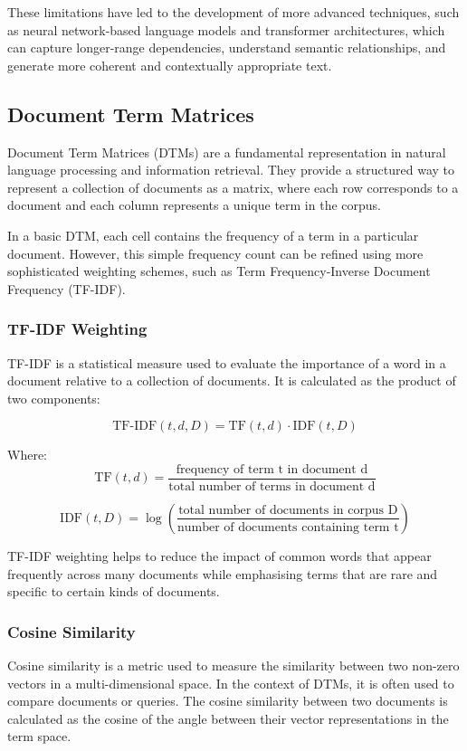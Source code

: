 \documentclass[a4paper, oneside]{discothesis}
\begin{document}
These limitations have led to the development of more advanced techniques, such as neural network-based language models and transformer architectures, which can capture longer-range dependencies, understand semantic relationships, and generate more coherent and contextually appropriate text.

\subsection{Document Term Matrices}
Document Term Matrices (DTMs) are a fundamental representation in natural language processing and information retrieval. They provide a structured way to represent a collection of documents as a matrix, where each row corresponds to a document and each column represents a unique term in the corpus.

In a basic DTM, each cell contains the frequency of a term in a particular document. 
However, this simple frequency count can be refined using more sophisticated weighting schemes, such as Term Frequency-Inverse Document Frequency (TF-IDF).

\subsubsection{TF-IDF Weighting}
TF-IDF is a statistical measure used to evaluate the importance of a word in a document relative to a collection of documents. It is calculated as the product of two components:

\begin{equation}
\text{TF-IDF}(t,d,D) = \text{TF}(t,d) \cdot \text{IDF}(t,D)
\end{equation}

Where:
\begin{equation}
\text{TF}(t,d) = \frac{\text{frequency of term t in document d}}{\text{total number of terms in document d}}
\end{equation}

\begin{equation}
\text{IDF}(t,D) = \log\left(\frac{\text{total number of documents in corpus D}}{\text{number of documents containing term t}}\right)
\end{equation}

TF-IDF weighting helps to reduce the impact of common words that appear frequently across many documents while emphasising terms that are rare and specific to certain kinds of documents.

\subsubsection{Cosine Similarity}
Cosine similarity is a metric used to measure the similarity between two non-zero vectors in a multi-dimensional space. In the context of DTMs, it is often used to compare documents or queries. The cosine similarity between two documents is calculated as the cosine of the angle between their vector representations in the term space.
\end{document}

